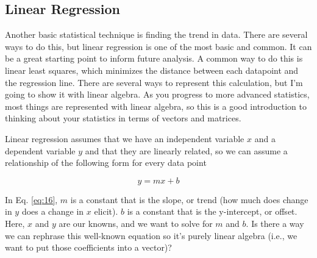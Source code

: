 \documentclass{article}
\begin{document}
\subsection{Linear Regression}
Another basic statistical technique is finding the trend in data. There are several ways to do this, but linear regression is one of the most basic and common. It can be a great starting point to inform future analysis. A common way to do this is linear least squares, which  minimizes the distance between each datapoint and the regression line. There are several ways to represent this calculation, but I'm going to show it with linear algebra. As you progress to more advanced statistics, most things are represented with linear algebra, so this is a good introduction to thinking about your statistics in terms of vectors and matrices. 

Linear regression assumes that we have an independent variable $x$ and a dependent variable $y$ and that they are linearly related, so we can assume a relationship of the following form for every data point 

\begin{equation}
\label{eq:16}
y = m x + b
\end{equation}

In Eq. \ref{eq:16}, $m$ is a constant that is the slope, or trend (how much does change in $y$ does a change in $x$ elicit). $b$ is a constant that is the y-intercept, or offset. Here, $x$ and $y$ are our knowns, and we want to solve for $m$ and $b$. Is there a way we can rephrase this well-known equation so it's purely linear algebra (i.e., we want to put those coefficients into a vector)?
\end{document}
